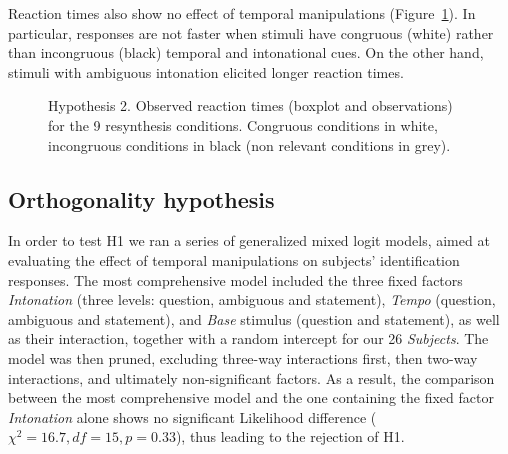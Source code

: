 Reaction times also show no effect of temporal manipulations (Figure~\ref{fig503}). In particular, responses are not faster when stimuli have congruous (white) rather than incongruous (black) temporal and intonational cues. On the other hand, stimuli with ambiguous intonation elicited longer reaction times.

\begin{figure}
\centering
{}
\caption{Hypothesis 2. Observed reaction times (boxplot and observations) for the 9 resynthesis conditions. Congruous conditions in white, incongruous conditions in black (non relevant conditions in grey).}
\label{fig503}\end{figure}

\subsection{Orthogonality hypothesis}\label{sec531}
In order to test H1 we ran a series of generalized mixed logit models, aimed at evaluating the effect of temporal manipulations on subjects' identification responses. The most comprehensive model included the three fixed factors \textit{Intonation} (three levels: question, ambiguous and statement), \textit{Tempo} (question, ambiguous and statement), and \textit{Base} stimulus (question and statement), as well as their interaction, together with a random intercept for our 26 \textit{Subjects}. The model was then pruned, excluding three-way interactions first, then two-way interactions, and ultimately non-significant factors. As a result, the comparison between the most comprehensive model and the one containing the fixed factor \textit{Intonation} alone shows no significant Likelihood difference ($\chi^{2}=16.7, df=15, p=0.33$), thus leading to the rejection of H1.

